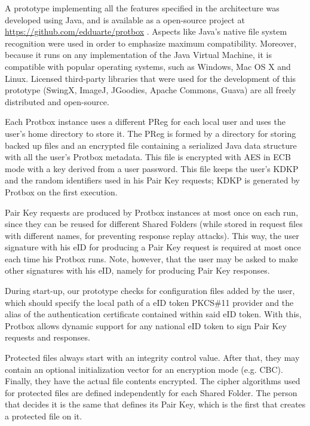 \documentclass[english]{lni}
\newcommand\protbox{Protbox}
\newcommand\SharedF{Shared Folder}
\newcommand\SharedFs{Shared Folders}
\newcommand\PairKey{Pair Key}
\begin{document}
A prototype implementing all the features specified in the
architecture was developed using Java, and is available as
a open-source project at \\
\url{https://github.com/edduarte/protbox}
. Aspects like Java's native file 
system recognition were used in order to emphasize maximum
compatibility. Moreover, because it runs on any implementation of
the Java Virtual Machine, it is compatible with popular operating
systems, such as Windows, Mac OS X and Linux. Licensed third-party
libraries that were used for the development of this prototype
(SwingX, ImageJ, JGoodies, Apache Commons, Guava) are all freely
distributed and open-source.

Each {\protbox} instance uses a different PReg for each local user
and uses the user's home directory to store it. The PReg is formed
by a directory for storing backed up files and an encrypted file
containing a serialized Java data structure with all the
user's {\protbox} metadata. This file is encrypted with AES in ECB
mode with a key derived from a user password. This file keeps the
user's KDKP and the random identifiers used in his {\PairKey}
requests; KDKP is generated by {\protbox} on the first execution.

{\PairKey} requests are produced by {\protbox} instances at most
once on each run, since they can be reused for different {\SharedFs}
(while stored in request files with different names, for preventing response
replay attacks). This way, the user signature with his eID for producing a
{\PairKey} request is required at most once each time his {\protbox}
runs. Note, however, that the user may be asked to make other
signatures with his eID, namely for producing {\PairKey} responses.

During start-up, our prototype checks for configuration
files added by the user, which should specify the local path of a
eID token PKCS\#11 provider and the alias of the authentication certificate
contained within said eID token. With this, {\protbox} allows
dynamic support for any national eID token to sign {\PairKey} requests
and responses.

Protected files always start with an integrity control value. After that,
they may contain an optional initialization vector for an encryption
mode (e.g. CBC). Finally, they have the actual file contents
encrypted. The cipher algorithms used for protected files are
defined independently for each {\SharedF}. The person that decides
it is the same that defines its {\PairKey}, which is the first that
creates a protected file on it.
\end{document}
